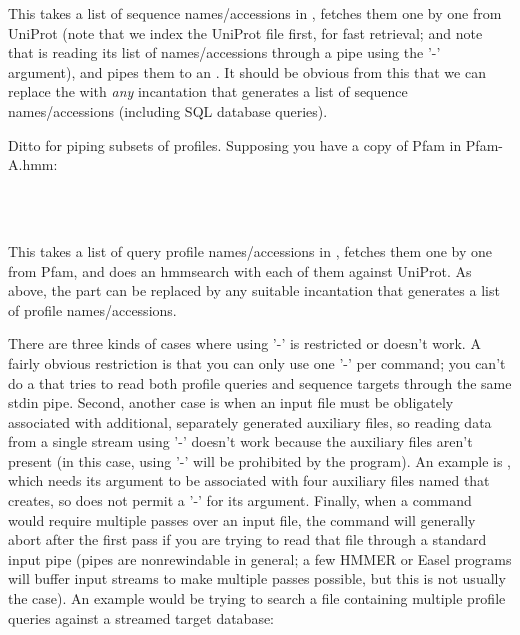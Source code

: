 This takes a list of sequence names/accessions in
, fetches them one by one from UniProt (note that
we index the UniProt file first, for fast retrieval; and note that
 is reading its  list of
names/accessions through a pipe using the '-' argument), and pipes
them to an . It should be obvious from this that we
can replace the  with \emph{any} incantation
that generates a list of sequence names/accessions (including SQL
database queries).

Ditto for piping subsets of profiles. Supposing you have a copy of
Pfam in Pfam-A.hmm:

   \vspace{1ex}
   \begin{fullwidth}
    \\
   \\
   \end{fullwidth}
   \vspace{1ex}

This takes a list of query profile names/accessions in
, fetches them one by one from Pfam, and does an
hmmsearch with each of them against UniProt. As above, the  part can be replaced by any suitable incantation
that generates a list of profile names/accessions.

There are three kinds of cases where using '-' is restricted or
doesn't work. A fairly obvious restriction is that you can only use
one '-' per command; you can't do a  that tries to
read both profile queries and sequence targets through the same stdin
pipe. Second, another case is when an input file must be obligately
associated with additional, separately generated auxiliary files, so
reading data from a single stream using '-' doesn't work because the
auxiliary files aren't present (in this case, using '-' will be
prohibited by the program). An example is , which needs
its  argument to be associated with four auxiliary
files named  that  creates,
so  does not permit a '-' for its 
argument. Finally, when a command would require multiple passes over
an input file, the command will generally abort after the first pass
if you are trying to read that file through a standard input pipe
(pipes are nonrewindable in general; a few HMMER or Easel programs
will buffer input streams to make multiple passes possible, but this
is not usually the case). An example would be trying to search a file
containing multiple profile queries against a streamed target
database:

